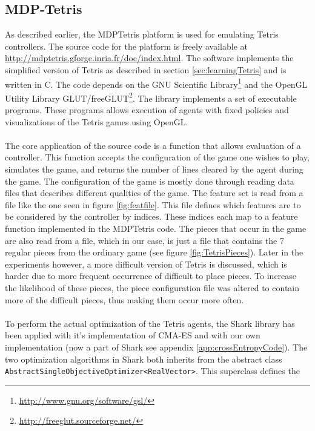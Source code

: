 \subsection{MDP-Tetris \label{sec:MDPTetris}}

As described earlier, the MDPTetris platform is used for emulating Tetris controllers. 
The source code for the 
platform is freely available at \url{http://mdptetris.gforge.inria.fr/doc/index.html}.
The software implements the simplified version of Tetris as described in 
section \ref{sec:learningTetris} and is written in C. The code depends on
the GNU Scientific Library\footnote{\url{http://www.gnu.org/software/gsl/}} and
the OpenGL Utility 
Library GLUT/freeGLUT\footnote{\url{http://freeglut.sourceforge.net/}}.
The library implements a set of executable programs. These programs 
allows execution of agents with fixed policies and visualizations
of the Tetris games using OpenGL.\\
\\
The core application of the source code is a function that allows evaluation of 
a controller. This function accepts the configuration of the game one wishes to play,
simulates the game, and returns the number of lines cleared by the agent during the game.
The configuration of the game is mostly done through reading data files that describes 
different qualities of the game. The feature set is read from a file
like the one seen in figure \ref{fig:featfile}. This file defines which features are to be 
considered by the controller by indices. These indices each map to a feature function 
implemented in the MDPTetris code. The pieces that occur in the game are also read from a file,
which in our case, is just a file that contains the 7 regular pieces from the ordinary game
(see figure \ref{fig:TetrisPieces}). Later in the experiments however, a more difficult version of Tetris
is discussed, which is harder due to more frequent occurrence of difficult to place pieces.
To increase the likelihood of these pieces, the piece configuration file was altered to
contain more of the difficult pieces, thus making them occur more often.\\
\\
To perform the actual optimization of the Tetris agents, the Shark library has been applied
with it's implementation of CMA-ES and with our own implementation (now a part of Shark
see appendix \ref{app:crossEntropyCode}). The two optimization algorithms in Shark both 
inherits from the abstract class 
\lstinline$AbstractSingleObjectiveOptimizer<RealVector>$. This superclass defines the
